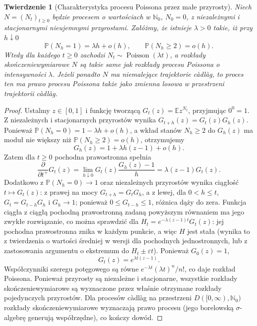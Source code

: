 \documentclass[11pt,a4paper,oneside]{report}
\numberwithin{equation}{chapter}
\theoremstyle{plain}
\newtheorem{twierdzenie}{Twierdzenie}[chapter]
\theoremstyle{definition}
\theoremstyle{remark}
\newcommand{\N}{\mathbb{N}}
\newcommand{\Prob}{\mathbb{P}}
\newcommand{\E}{\mathbb{E}}
\begin{document}
\begin{twierdzenie}[Charakterystyka procesu Poissona przez małe przyrosty]
\label{thm:poisson-infinitesimal}
Niech $N=(N_t)_{t\ge0}$ będzie procesem o wartościach
w $\N_0$, $N_0=0$, z niezależnymi i stacjonarnymi
nieujemnymi przyrostami. Załóżmy, że istnieje $\lambda>0$
takie, iż przy $h\downarrow0$
\[
\Prob(N_h=1)=\lambda h+o(h),\qquad
\Prob(N_h\ge2)=o(h).
\]
Wtedy dla każdego $t\ge0$ zachodzi
$N_t\sim\operatorname{Poisson}(\lambda t)$,
a rozkłady skończeniewymiarowe $N$ są takie same jak
rozkłady procesu Poissona o intensywności $\lambda$.
Jeżeli ponadto $N$ ma niemalejące trajektorie c\`adl\`ag,
to proces ten ma prawo procesu Poissona także jako
zmienna losowa w przestrzeni trajektorii c\`adl\`ag.
\end{twierdzenie}
\begin{proof}
Ustalmy $z\in[0,1]$ i funkcję tworzącą
$G_t(z)=\E z^{N_t}$, przyjmując $0^0=1$.
Z niezależnych i stacjonarnych przyrostów wynika
$G_{t+h}(z)=G_t(z)G_h(z)$. Ponieważ
$\Prob(N_h=0)=1-\lambda h+o(h)$, a wkład stanów
$N_h\ge2$ do $G_h(z)$ ma moduł nie większy niż
$\Prob(N_h\ge2)=o(h)$, otrzymujemy
\[
G_h(z)=1+\lambda h(z-1)+o(h).
\]
Zatem dla $t\ge0$ pochodna prawostronna spełnia
\[
\frac{\partial}{\partial t^+}G_t(z)
=\lim_{h\downarrow0}G_t(z)\frac{G_h(z)-1}{h}
=\lambda(z-1)G_t(z).
\]
Dodatkowo z $\Prob(N_h=0)\to1$ oraz niezależnych przyrostów
wynika ciągłość $t\mapsto G_t(z)$: z prawej na mocy
$G_{t+h}=G_tG_h$, a z lewej, dla $0<h\le t$,
$G_t=G_{t-h}G_h$ i $G_h\to1$; ponieważ
$0\le G_{t-h}\le1$, różnica dąży do zera.
Funkcja ciągła z ciągłą pochodną prawostronną zadaną
powyższym równaniem ma jego zwykłe rozwiązanie,
co można sprawdzić dla
$H_t=e^{-\lambda(z-1)t}G_t(z)$:
jej pochodna prawostronna znika w każdym punkcie,
a więc $H$ jest stała (wynika to z twierdzenia
o wartości średniej w wersji dla pochodnych jednostronnych,
lub z zastosowania argumentu o ekstremum do
$H_t\pm\varepsilon t$). Ponieważ $G_0(z)=1$,
\[
G_t(z)=e^{\lambda t(z-1)}.
\]
Współczynniki szeregu potęgowego są równe
$e^{-\lambda t}(\lambda t)^n/n!$, co daje rozkład Poissona.
Ponieważ przyrosty są niezależne i stacjonarne,
wszystkie rozkłady skończeniewymiarowe są wyznaczone
przez właśnie otrzymane rozkłady pojedynczych przyrostów.
Dla procesów c\`adl\`ag na przestrzeni $D([0,\infty),\N_0)$
rozkłady skończeniewymiarowe wyznaczają prawo procesu
(jego borelowską $\sigma$-algebrę generują współrzędne),
co kończy dowód.
\end{proof}
\end{document}
